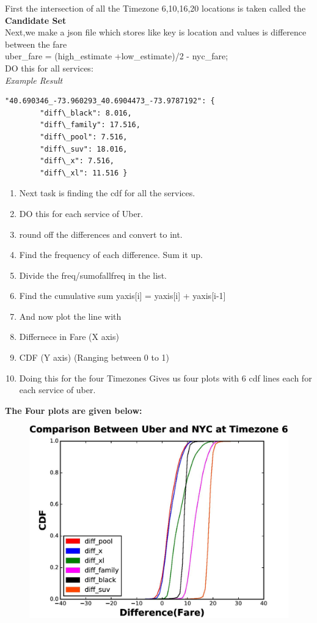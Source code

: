 \documentclass{article}
\begin{document}
First the intersection of all the Timezone 6,10,16,20 locations is taken called the \textbf{Candidate Set}
\\Next,we make a json file which stores like key is location and values is difference between the fare
\\ uber\_fare = (high\_estimate +low\_estimate)/2 - nyc\_fare;
\\ DO this for all services:
\\
\linebreak
\linebreak
\linebreak
\noindent
{\it Example Result}
\begin{verbatim}
"40.690346_-73.960293_40.6904473_-73.9787192": {
        "diff\_black": 8.016,
        "diff\_family": 17.516,
        "diff\_pool": 7.516,
        "diff\_suv": 18.016,
        "diff\_x": 7.516,
        "diff\_xl": 11.516 }
\end{verbatim}
\begin{enumerate}
\item Next task is finding the cdf for all the services. 
\item DO this for each service of Uber.
\item round off the differences and convert to int.
\item Find the frequency of each difference. Sum it up.
\item Divide the freq/sumofallfreq in the list.
\item Find the cumulative sum yaxis[i] = yaxis[i] + yaxis[i-1]
\item And now plot the line with 
\item Differnece in Fare (X axis)
\item CDF (Y axis) (Ranging between 0 to 1)
\item Doing this for the four  Timezones Gives us four plots with 6 cdf lines each for each service of uber.
\end{enumerate}
\textbf{The Four plots are given below:}


\begin{figure}
\begin{center}
\includegraphics[width=0.7\columnwidth]{figures/four}

\end{center}
\end{figure}
\end{document}
